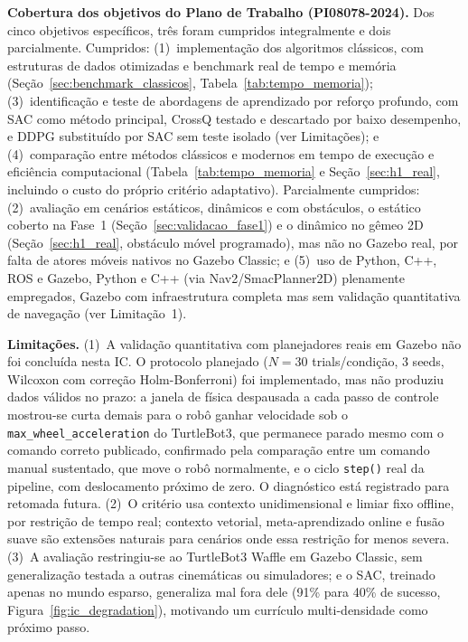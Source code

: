 \documentclass[12pt, a4paper]{article}
\begin{document}
\textbf{Cobertura dos objetivos do Plano de Trabalho (PI08078-2024).} Dos cinco objetivos
específicos, três foram cumpridos integralmente e dois parcialmente. Cumpridos: (1)~implementação
dos algoritmos clássicos, com estruturas de dados otimizadas e benchmark real de tempo e memória
(Seção~\ref{sec:benchmark_classicos}, Tabela~\ref{tab:tempo_memoria}); (3)~identificação e teste
de abordagens de aprendizado por reforço profundo, com SAC como método principal, CrossQ testado
e descartado por baixo desempenho, e DDPG substituído por SAC sem teste isolado (ver
Limitações); e (4)~comparação entre métodos clássicos e modernos em tempo de execução e
eficiência computacional (Tabela~\ref{tab:tempo_memoria} e Seção~\ref{sec:h1_real}, incluindo o
custo do próprio critério adaptativo). Parcialmente cumpridos: (2)~avaliação em cenários
estáticos, dinâmicos e com obstáculos, o estático coberto na Fase~1
(Seção~\ref{sec:validacao_fase1}) e o dinâmico no gêmeo 2D (Seção~\ref{sec:h1_real}, obstáculo
móvel programado), mas não no Gazebo real, por falta de atores móveis nativos no Gazebo Classic;
e (5)~uso de Python, C++, ROS e Gazebo, Python e C++ (via Nav2/SmacPlanner2D) plenamente
empregados, Gazebo com infraestrutura completa mas sem validação quantitativa de navegação (ver
Limitação~1).

\textbf{Limitações.} (1)~A validação quantitativa com planejadores reais em Gazebo não foi
concluída nesta IC. O protocolo planejado ($N{=}30$ trials/condição, 3 seeds, Wilcoxon com
correção Holm-Bonferroni) foi implementado, mas não produziu dados válidos no prazo: a janela de
física despausada a cada passo de controle mostrou-se curta demais para o robô ganhar
velocidade sob o \texttt{max\_wheel\_acceleration} do TurtleBot3, que permanece parado mesmo com
o comando correto publicado, confirmado pela comparação entre um comando manual sustentado, que
move o robô normalmente, e o ciclo \texttt{step()} real da pipeline, com deslocamento próximo de
zero. O diagnóstico está registrado para retomada futura. (2)~O critério usa contexto
unidimensional e limiar fixo offline, por restrição de tempo real; contexto vetorial,
meta-aprendizado online e fusão suave são extensões naturais para cenários onde essa restrição
for menos severa. (3)~A avaliação restringiu-se ao TurtleBot3 Waffle em Gazebo Classic, sem
generalização testada a outras cinemáticas ou simuladores; e o SAC, treinado apenas no mundo
esparso, generaliza mal fora dele (91\% para 40\% de sucesso, Figura~\ref{fig:ic_degradation}),
motivando um currículo multi-densidade como próximo passo.
\end{document}
